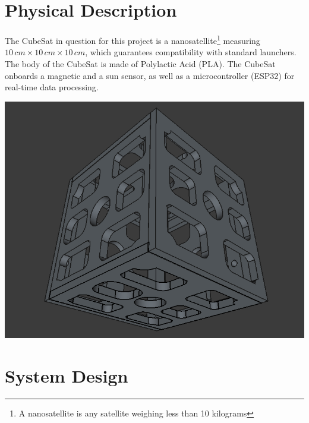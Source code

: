 \documentclass[a4paper, 12pt]{article}
\begin{document}
\section{Physical Description}

\begin{minipage}{0.55\textwidth}
The CubeSat in question for this project is a nanosatellite\footnote{A nanosatellite is any satellite weighing less than 10 kilograms} \cite{noauthor_basic_nodate} measuring $10\,cm \times 10\,cm \times 10\,cm$, which guarantees compatibility with standard launchers. The body of the CubeSat is made of Polylactic Acid (PLA). The CubeSat onboards a magnetic and a sun sensor, as well as a microcontroller (ESP32) for real-time data processing.
\end{minipage}
\hfill
\begin{minipage}{0.4\textwidth}
    \centering
    \includegraphics[width=\linewidth]{fig/cubesat3D.png}
    \label{fig:3DdesignedCubeSat}
\end{minipage}


\section{System Design}
\end{document}
